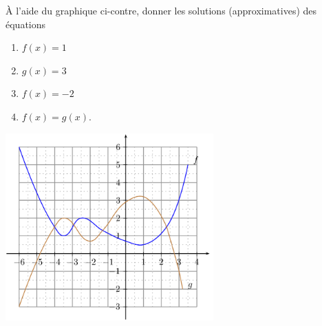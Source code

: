 
\begin{exercice}\label{exoSeconde-0070}

    \begin{multicols}{2}

        À l'aide du graphique ci-contre, donner les solutions (approximatives) des équations
        \begin{enumerate}
            \item
                \( f(x)=1\)
            \item
                \( g(x)=3\)
            \item
                \( f(x)=-2\)
            \item
                $f(x)=g(x)$.
        \end{enumerate}

        \columnbreak

%

\includegraphics[width=8.0cm]{Picture_FIGLabelFigExResolutionOSiaMSPICTExResolutionOSiaMS-for_eps.png}


    \end{multicols}

\end{exercice}

